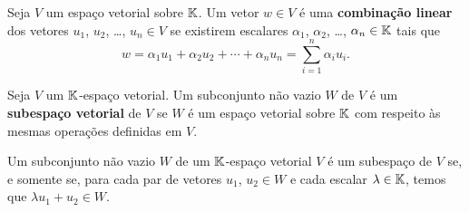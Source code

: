 \documentclass{beamer}
\begin{document}
    \begin{frame}
        \begin{definicao}
	        Seja $V$ um espa\c{c}o vetorial sobre $\mathbb{K}$.
	        Um vetor $w \in V$ \'e uma \textbf{combina\c{c}\~ao linear} dos vetores $u_1$, $u_2$, \dots, $u_n \in V$ se existirem escalares $\alpha_1$, $\alpha_2$, \dots, $\alpha_n \in \mathbb{K}$ tais que
    	    \[
	    	    w = \alpha_1 u_1 + \alpha_2u_2 + \cdots + \alpha_nu_n = \sum_{i = 1}^n \alpha_iu_i.
        	\]
        \end{definicao}
    \end{frame}

    \begin{frame}
        \begin{definicao}
        	Seja $V$ um $\mathbb{K}$-espa\c{c}o vetorial. Um subconjunto n\~ao vazio $W$ de $V$ \'e um \textbf{subespa\c{c}o vetorial} de $V$ se $W$ é um espaço vetorial sobre $\mathbb{K}$ com respeito às mesmas operações
        	definidas em $V$.
        \end{definicao}
        
        \begin{teorema}
        	Um subconjunto n\~ao vazio $W$ de um $\mathbb{K}$-espa\c{c}o vetorial $V$ \'e um subespa\c{c}o de $V$ se, e somente se, para cada par de vetores $u_1$, $u_2 \in W$ e cada escalar $\lambda \in \mathbb{K}$, temos que $\lambda u_1 + u_2 \in W$.
        \end{teorema}
    \end{frame}
\end{document}
